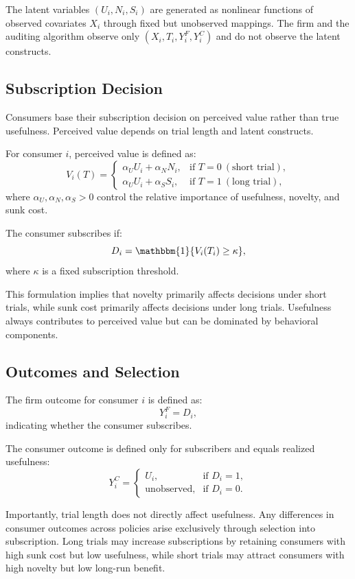 \documentclass[11pt,letterpaper,english]{article}
\theoremstyle{definition}
\theoremstyle{definition}
\begin{document}
\begin{bibunit}
The latent variables $(U_i, N_i, S_i)$ are generated as nonlinear functions of observed covariates $X_i$ through fixed but unobserved mappings. The firm and the auditing algorithm observe only $(X_i, T_i, Y_i^F, Y_i^C)$ and do not observe the latent constructs.

\subsection{Subscription Decision}
\label{sec:simulation2-decision}

Consumers base their subscription decision on perceived value rather than true usefulness. Perceived value depends on trial length and latent constructs.

For consumer $i$, perceived value is defined as:
\[
V_i(T) =
\begin{cases}
\alpha_U U_i + \alpha_N N_i, & \text{if } T=0 \ (\text{short trial}), \\
\alpha_U U_i + \alpha_S S_i, & \text{if } T=1 \ (\text{long trial}),
\end{cases}
\]
where $\alpha_U, \alpha_N, \alpha_S > 0$ control the relative importance of usefulness, novelty, and sunk cost.

The consumer subscribes if:
\[
D_i = \mathbbm{1}\{ V_i(T_i) \geq \kappa \},
\]
where $\kappa$ is a fixed subscription threshold.

This formulation implies that novelty primarily affects decisions under short trials, while sunk cost primarily affects decisions under long trials. Usefulness always contributes to perceived value but can be dominated by behavioral components.

\subsection{Outcomes and Selection}
\label{sec:simulation2-outcomes}

The firm outcome for consumer $i$ is defined as:
\[
Y_i^F = D_i,
\]
indicating whether the consumer subscribes.

The consumer outcome is defined only for subscribers and equals realized usefulness:
\[
Y_i^C =
\begin{cases}
U_i, & \text{if } D_i = 1, \\
\text{unobserved}, & \text{if } D_i = 0.
\end{cases}
\]

Importantly, trial length does not directly affect usefulness. Any differences in consumer outcomes across policies arise exclusively through selection into subscription. Long trials may increase subscriptions by retaining consumers with high sunk cost but low usefulness, while short trials may attract consumers with high novelty but low long-run benefit.


\end{bibunit}
\end{document}
